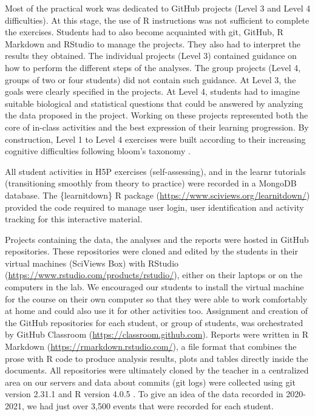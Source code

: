 \documentclass{aims}
\theoremstyle{definition}
\begin{document}
Most of the practical work was dedicated to GitHub projects (Level 3 and
Level 4 difficulties). At this stage, the use of R instructions was not
sufficient to complete the exercises. Students had to also become
acquainted with git, GitHub, R Markdown and RStudio to manage the
projects. They also had to interpret the results they obtained. The
individual projects (Level 3) contained guidance on how to perform the
different steps of the analyses. The group projects (Level 4, groups of
two or four students) did not contain such guidance. At Level 3, the
goals were clearly specified in the projects. At Level 4, students had
to imagine suitable biological and statistical questions that could be
answered by analyzing the data proposed in the project. Working on these
projects represented both the core of in-class activities and the best
expression of their learning progression. By construction, Level 1 to
Level 4 exercises were built according to their increasing cognitive
difficulties following bloom's taxonomy \cite{Krathwohl2002}.

All student activities in H5P exercises (self-assessing), and in the
learnr tutorials (transitioning smoothly from theory to practice) were
recorded in a MongoDB database. The \{learnitdown\} R package
(\url{https://www.sciviews.org/learnitdown/}) provided the code required
to manage user login, user identification and activity tracking for this
interactive material.

Projects containing the data, the analyses and the reports were hosted
in GitHub repositories. These repositories were cloned and edited by the
students in their virtual machines (SciViews Box) with RStudio
(\url{https://www.rstudio.com/products/rstudio/}), either on their
laptops or on the computers in the lab. We encouraged our students to
install the virtual machine for the course on their own computer so that
they were able to work comfortably at home and could also use it for
other activities too. Assignment and creation of the GitHub repositories
for each student, or group of students, was orchestrated by GitHub
Classroom (\url{https://classroom.github.com}). Reports were written in
R Markdown (\url{https://rmarkdown.rstudio.com/}), a file format that
combines the prose with R code to produce analysis results, plots and
tables directly inside the documents. All repositories were ultimately
cloned by the teacher in a centralized area on our servers and data
about commits (git logs) were collected using git version 2.31.1 and R
version 4.0.5 \cite{Rcoreteam2021}. To give an idea of the data recorded
in 2020-2021, we had just over 3,500 events that were recorded for each
student.
\end{document}
